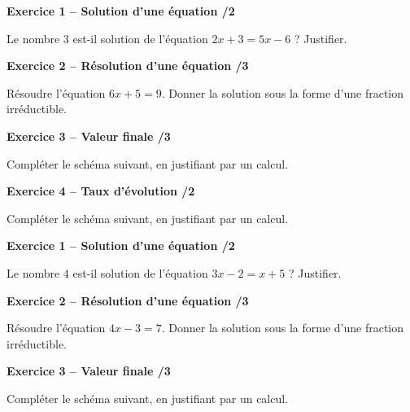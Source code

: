 \documentclass[10pt,a4paper]{article}
\begin{document}


\textbf{Exercice 1 -- Solution d'une équation \hfill /2}

Le nombre \(3\) est-il solution de l'équation \(2x+3=5x-6\) ? Justifier.

\vspace{4cm}

\textbf{Exercice 2 -- Résolution d'une équation \hfill /3}

Résoudre l'équation \(6x+5=9\). Donner la solution sous la forme d'une fraction irréductible.

\vspace{4cm}

\textbf{Exercice 3 -- Valeur finale \hfill /3}

Compléter le schéma suivant, en justifiant par un calcul.


\vspace{3.5cm}

\textbf{Exercice 4 -- Taux d'évolution \hfill /2}

Compléter le schéma suivant, en justifiant par un calcul.


\newpage



\textbf{Exercice 1 -- Solution d'une équation \hfill /2}

Le nombre \(4\) est-il solution de l'équation \(3x-2=x+5\) ? Justifier.

\vspace{4cm}

\textbf{Exercice 2 -- Résolution d'une équation \hfill /3}

Résoudre l'équation \(4x-3=7\). Donner la solution sous la forme d'une fraction irréductible.

\vspace{4cm}

\textbf{Exercice 3 -- Valeur finale \hfill /3}

Compléter le schéma suivant, en justifiant par un calcul.
\end{document}
